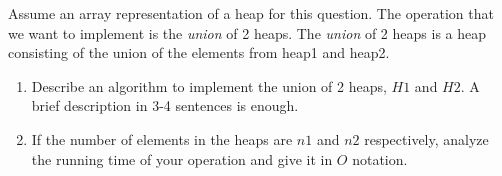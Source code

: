 Assume an array representation of a heap for this question. The
operation that we want to implement is the {\em union} of 2 heaps. The
{\em union} of 2 heaps is a heap consisting of the union of the
elements from heap1 and heap2.

\begin{enumerate}
\item  Describe an algorithm to implement the union of 2 heaps, $H1$
and $H2$. A brief description in 3-4 sentences is enough.
 
\item  If the number of elements in the heaps are $n1$ and $n2$
respectively, analyze the running time of your operation and give it
in $O$ notation.
\end{enumerate}
